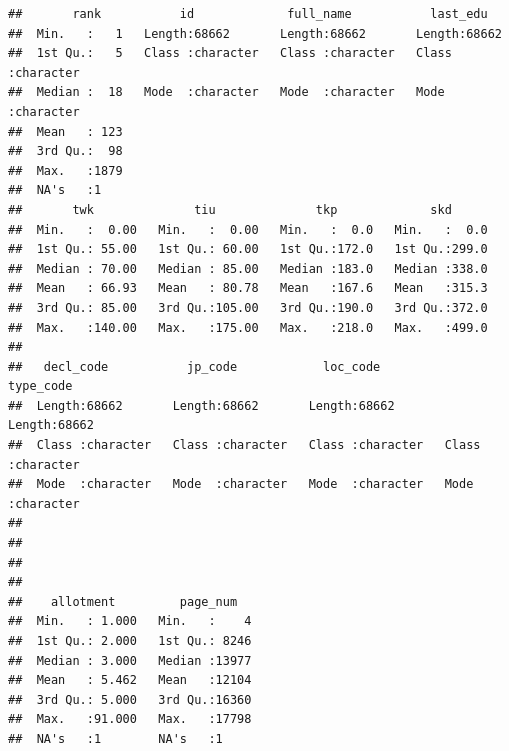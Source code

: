 \documentclass[
]{article}
\newenvironment{Shaded}{\begin{snugshade}}{\end{snugshade}}
\newcommand{\FunctionTok}[1]{\textcolor[rgb]{0.13,0.29,0.53}{\textbf{#1}}}
\newcommand{\NormalTok}[1]{#1}
\newcommand{\SpecialCharTok}[1]{\textcolor[rgb]{0.81,0.36,0.00}{\textbf{#1}}}
\begin{document}
\begin{verbatim}
##       rank           id             full_name           last_edu        
##  Min.   :   1   Length:68662       Length:68662       Length:68662      
##  1st Qu.:   5   Class :character   Class :character   Class :character  
##  Median :  18   Mode  :character   Mode  :character   Mode  :character  
##  Mean   : 123                                                           
##  3rd Qu.:  98                                                           
##  Max.   :1879                                                           
##  NA's   :1                                                              
##       twk              tiu              tkp             skd       
##  Min.   :  0.00   Min.   :  0.00   Min.   :  0.0   Min.   :  0.0  
##  1st Qu.: 55.00   1st Qu.: 60.00   1st Qu.:172.0   1st Qu.:299.0  
##  Median : 70.00   Median : 85.00   Median :183.0   Median :338.0  
##  Mean   : 66.93   Mean   : 80.78   Mean   :167.6   Mean   :315.3  
##  3rd Qu.: 85.00   3rd Qu.:105.00   3rd Qu.:190.0   3rd Qu.:372.0  
##  Max.   :140.00   Max.   :175.00   Max.   :218.0   Max.   :499.0  
##                                                                   
##   decl_code           jp_code            loc_code          type_code        
##  Length:68662       Length:68662       Length:68662       Length:68662      
##  Class :character   Class :character   Class :character   Class :character  
##  Mode  :character   Mode  :character   Mode  :character   Mode  :character  
##                                                                             
##                                                                             
##                                                                             
##                                                                             
##    allotment         page_num    
##  Min.   : 1.000   Min.   :    4  
##  1st Qu.: 2.000   1st Qu.: 8246  
##  Median : 3.000   Median :13977  
##  Mean   : 5.462   Mean   :12104  
##  3rd Qu.: 5.000   3rd Qu.:16360  
##  Max.   :91.000   Max.   :17798  
##  NA's   :1        NA's   :1
\end{verbatim}

\begin{Shaded}
\end{Shaded}
\end{document}
